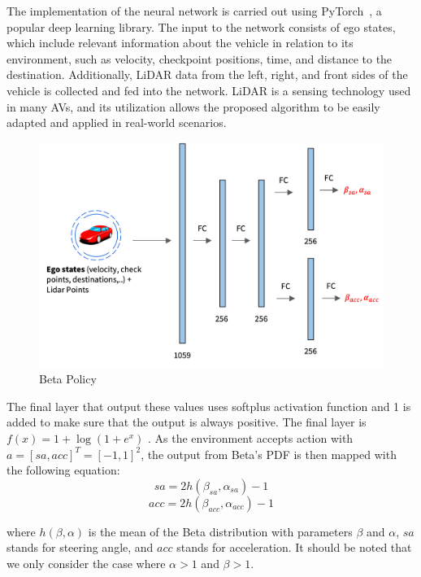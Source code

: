 The implementation of the neural network is carried out using PyTorch~\cite{paszke2019pytorch}, a popular deep learning library. The input to the network consists of ego states, which include relevant information about the vehicle in relation to its environment, such as velocity, checkpoint positions, time, and distance to the destination. Additionally, LiDAR data from the left, right, and front sides of the vehicle is collected and fed into the network. LiDAR is a sensing technology used in many AVs, and its utilization allows the proposed algorithm to be easily adapted and applied in real-world scenarios.
\begin{figure}[h!]
    \centering
    \includegraphics[width=12cm]{assets/beta_policy}
    \caption{Beta Policy}\label{fig:beta-policy}
\end{figure}

The final layer that output these values uses softplus
activation function and 1 is added to make sure that the output
is always positive. The final layer is $f(x) = 1 + \log (1 +
e^x)$ . As the environment accepts action with $a = [sa,acc]^T=[-1,1]^2$, the output from Beta's PDF is then mapped with the following equation:
\begin{equation}
    sa = 2h(\beta_{sa}, \alpha_{sa}) - 1\label{eq:equation5}
\end{equation}
\begin{equation}
    acc = 2h(\beta_{acc}, \alpha_{acc}) - 1\label{eq:equation6}
\end{equation}

where $h(\beta, \alpha)$ is the mean of the Beta distribution with parameters $\beta$ and $\alpha$, $sa$ stands for steering angle, and $acc$ stands for acceleration.
It should be noted that we only consider the case where $\alpha > 1$ and $\beta > 1$.

